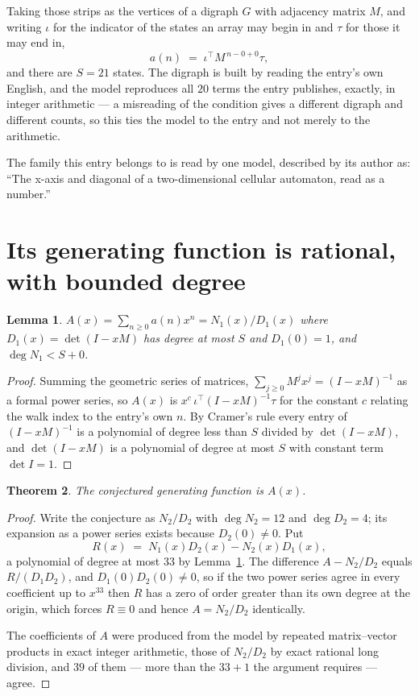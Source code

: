 \documentclass[11pt,a4paper]{article}
\theoremstyle{plain}
\newtheorem{theorem}{Theorem}
\newtheorem{lemma}[theorem]{Lemma}
\theoremstyle{definition}
\begin{document}
Taking those strips as the vertices of a digraph $G$ with adjacency matrix $M$, and writing
$\iota$ for the indicator of the states an array may begin in and $\tau$ for those it may end
in,
\[
a(n)\;=\;\iota^{\!\top}M^{\,n-0+0}\tau ,
\]
and there are $S=21$ states. The digraph is built by reading the entry's own English, and the
model reproduces all $20$ terms the entry publishes, exactly, in integer arithmetic --- a
misreading of the condition gives a different digraph and different counts, so this ties the
model to the entry and not merely to the arithmetic.

The family this entry belongs to is read by one model, described by its author as: ``The x-axis and diagonal of a two-dimensional cellular automaton, read as a number.''


\section{Its generating function is rational, with bounded degree}

\begin{lemma}\label{lem:rat}
$A(x)=\sum_{n\ge0}a(n)x^n=N_1(x)/D_1(x)$ where $D_1(x)=\det(I-xM)$ has degree at most
$S$ and $D_1(0)=1$, and $\deg N_1<S+0$.
\end{lemma}

\begin{proof}
Summing the geometric series of matrices, $\sum_{j\ge0}M^jx^j=(I-xM)^{-1}$ as a formal
power series, so $A(x)$ is $x^{c}\,\iota^{\!\top}(I-xM)^{-1}\tau$ for the constant $c$
relating the walk index to the entry's own $n$. By Cramer's rule every entry of
$(I-xM)^{-1}$ is a polynomial of degree less than $S$ divided by $\det(I-xM)$, and
$\det(I-xM)$ is a polynomial of degree at most $S$ with constant term $\det I=1$.
\end{proof}

\begin{theorem}
The conjectured generating function is $A(x)$.
\end{theorem}

\begin{proof}
Write the conjecture as $N_2/D_2$ with $\deg N_2=12$ and $\deg D_2=4$; its expansion as a
power series exists because $D_2(0)\neq0$. Put
\[
R(x)\;=\;N_1(x)D_2(x)-N_2(x)D_1(x),
\]
a polynomial of degree at most $33$ by Lemma~\ref{lem:rat}. The difference
$A-N_2/D_2$ equals $R/(D_1D_2)$, and $D_1(0)D_2(0)\neq0$, so if the two power series agree in
every coefficient up to $x^{33}$ then $R$ has a zero of order greater than its own
degree at the origin, which forces $R\equiv0$ and hence $A=N_2/D_2$ identically.

The coefficients of $A$ were produced from the model by repeated matrix--vector products in
exact integer arithmetic, those of $N_2/D_2$ by exact rational long division, and $39$
of them --- more than the $33+1$ the argument requires --- agree.
\end{proof}
\end{document}
